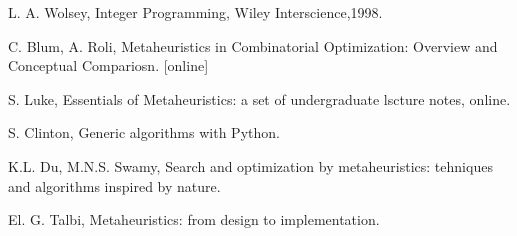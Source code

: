 \documentclass[12pt,a4paper]{amsart}
\theoremstyle{definition} %
\theoremstyle{plain} %
\begin{document}
\newpage

\begin{thebibliography}{9}
L. A. Wolsey, Integer Programming, Wiley Interscience,1998. 

 
C. Blum, A. Roli, Metaheuristics in Combinatorial Optimization: Overview and Conceptual Compariosn. [online]
 
S. Luke, Essentials of Metaheuristics: a set of undergraduate lscture notes, online. 

S. Clinton, Generic algorithms with Python.

K.L. Du, M.N.S. Swamy, Search and optimization by metaheuristics: tehniques and algorithms inspired by nature. 


El. G. Talbi, Metaheuristics: from design to implementation.

\end{thebibliography}
\end{document}
